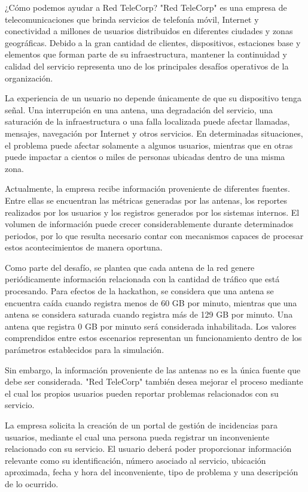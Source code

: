 ¿Cómo podemos ayudar a Red TeleCorp?
"Red TeleCorp" es una empresa de telecomunicaciones que brinda servicios de telefonía móvil, Internet y conectividad a millones de usuarios distribuidos en diferentes ciudades y zonas geográficas. Debido a la gran cantidad de clientes, dispositivos, estaciones base y elementos que forman parte de su infraestructura, mantener la continuidad y calidad del servicio representa uno de los principales desafíos operativos de la organización.

La experiencia de un usuario no depende únicamente de que su dispositivo tenga señal. Una interrupción en una antena, una degradación del servicio, una saturación de la infraestructura o una falla localizada puede afectar llamadas, mensajes, navegación por Internet y otros servicios. En determinadas situaciones, el problema puede afectar solamente a algunos usuarios, mientras que en otras puede impactar a cientos o miles de personas ubicadas dentro de una misma zona.

Actualmente, la empresa recibe información proveniente de diferentes fuentes. Entre ellas se encuentran las métricas generadas por las antenas, los reportes realizados por los usuarios y los registros generados por los sistemas internos. El volumen de información puede crecer considerablemente durante determinados periodos, por lo que resulta necesario contar con mecanismos capaces de procesar estos acontecimientos de manera oportuna.

Como parte del desafío, se plantea que cada antena de la red genere periódicamente información relacionada con la cantidad de tráfico que está procesando. Para efectos de la hackathon, se considera que una antena se encuentra caída cuando registra menos de 60 GB por minuto, mientras que una antena se considera saturada cuando registra más de 129 GB por minuto. Una antena que registra 0 GB por minuto será considerada inhabilitada. Los valores comprendidos entre estos escenarios representan un funcionamiento dentro de los parámetros establecidos para la simulación.

Sin embargo, la información proveniente de las antenas no es la única fuente que debe ser considerada. "Red TeleCorp" también desea mejorar el proceso mediante el cual los propios usuarios pueden reportar problemas relacionados con su servicio.

La empresa solicita la creación de un portal de gestión de incidencias para usuarios, mediante el cual una persona pueda registrar un inconveniente relacionado con su servicio. El usuario deberá poder proporcionar información relevante como su identificación, número asociado al servicio, ubicación aproximada, fecha y hora del inconveniente, tipo de problema y una descripción de lo ocurrido.

